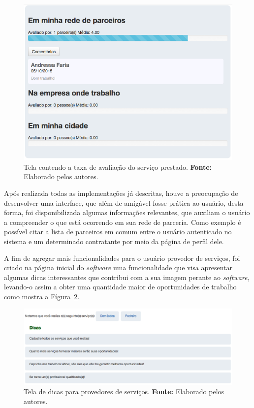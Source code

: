 \newpage
\begin{figure}[h!]
	\centerline{\includegraphics[scale=0.45]{./imagens/taxa-avaliacao.png}}
	\caption[Tela contendo a taxa de avaliação do serviço prestado.]
	{Tela contendo a taxa de avaliação do serviço prestado. \textbf{Fonte:} Elaborado pelos autores.}
	\label{fig:taxa_avaliacao}
\end{figure}

\par Após realizada todas as implementações já descritas, houve a preocupação de desenvolver uma interface, que além de amigável fosse prática ao usuário, desta forma, foi disponibilizada algumas informações relevantes, que auxiliam o usuário a compreender o que está ocorrendo em sua rede de parceria. Como exemplo é possível citar a lista de parceiros em comum entre o usuário autenticado no sistema e um determinado contratante por meio da página de perfil dele.

\par A fim de agregar mais funcionalidades para o usuário provedor de serviços, foi criado na página inicial do \textit{software} uma funcionalidade que visa apresentar algumas dicas interessantes que contribui com a sua imagem perante ao \textit{software}, levando-o assim a obter uma quantidade maior de oportunidades de trabalho como mostra a Fígura~\ref{fig:dicas_randomicas}.

\begin{figure}[h!]
	\centerline{\includegraphics[scale=0.4]{./imagens/dicas-randomicas.png}}
	\caption[Tela de dicas para provedores de serviços.]
	{Tela de dicas para provedores de serviços. \textbf{Fonte:} Elaborado pelos autores.}
	\label{fig:dicas_randomicas}
\end{figure}

